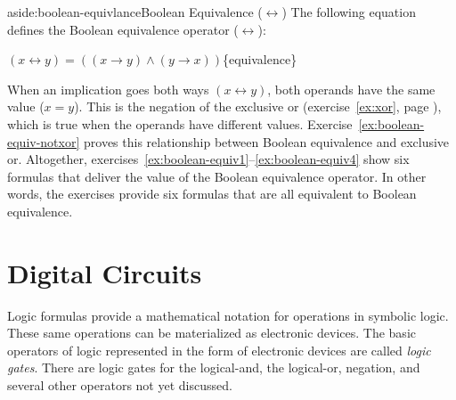 \begin{aside}{aside:boolean-equivlance}{Boolean Equivalence ($\leftrightarrow$)}
The following equation defines the
Boolean equivalence operator ($\leftrightarrow$):
\begin{center}
$(x \leftrightarrow y) = ((x \rightarrow y) \wedge (y \rightarrow x))$\hspace{5mm}\{equivalence\}
\end{center}
\noindent When an implication goes both ways $(x \leftrightarrow y)$,
both operands have the same value ($x = y$).
This is the negation of the
exclusive or
(exercise~\ref{ex:xor}, page \pageref{ex:xor}),
which is true when the operands have different values.
Exercise~\ref{ex:boolean-equiv-notxor} proves this relationship
between Boolean equivalence and exclusive or.
Altogether,
exercises~\ref{ex:boolean-equiv1}--\ref{ex:boolean-equiv4}
show six formulas that deliver the value of the Boolean equivalence operator.
In other words, the exercises provide six formulas that are all equivalent to
Boolean equivalence.
\end{aside}

\section{Digital Circuits}
\label{sec:digital-circuits}

Logic formulas provide a mathematical notation for operations in symbolic logic.
These same operations can be materialized as electronic devices.
The basic operators of logic represented in the form of electronic devices
are called \emph{logic gates}.
There are logic
gates
for the logical-and, the logical-or, negation, and
several other operators not yet discussed.

